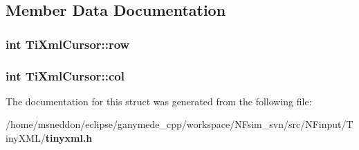 \subsection{Member Data Documentation}
\subsubsection{\setlength{\rightskip}{0pt plus 5cm}int {\bf TiXmlCursor::row}}\label{structTiXmlCursor_5b54dd949820c2db061e2be41f3effb3}


\subsubsection{\setlength{\rightskip}{0pt plus 5cm}int {\bf TiXmlCursor::col}}\label{structTiXmlCursor_5694d7ed2c4d20109d350c14c417969d}




The documentation for this struct was generated from the following file:\begin{CompactItemize}
\item 
/home/msneddon/eclipse/ganymede\_\-cpp/workspace/NFsim\_\-svn/src/NFinput/TinyXML/{\bf tinyxml.h}\end{CompactItemize}
